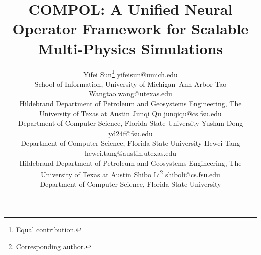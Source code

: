 \documentclass[twoside,11pt]{article}
\begin{document}
\title{COMPOL: A Unified Neural Operator Framework for Scalable Multi-Physics Simulations}



\author{
\name Yifei  Sun\thanks{Equal contribution.} \email yifeisun@umich.edu \\
\addr School of Information, University of Michigan--Ann Arbor
\AND
\name Tao Wang\footnotemark[1] \email tao.wang@utexas.edu \\
\addr Hildebrand Department of Petroleum and Geosystems Engineering, The University of Texas at Austin
\AND
\name Junqi Qu \email junqiqu@cs.fsu.edu \\
\addr Department of Computer Science, Florida State University
\AND
\name Yushun Dong \email yd24f@fsu.edu \\
\addr Department of Computer Science, Florida State University
\AND
\name Hewei Tang \email hewei.tang@austin.utexas.edu \\
\addr Hildebrand Department of Petroleum and Geosystems Engineering, The University of Texas at Austin
\AND
\name Shibo Li\thanks{Corresponding author.} \email shiboli@cs.fsu.edu \\
\addr Department of Computer Science, Florida State University
}


\begingroup
\renewcommand\thefootnote{\fnsymbol{footnote}} 
\maketitle
\endgroup


\clearpage 







\newpage





\newpage

\appendix



\end{document}
